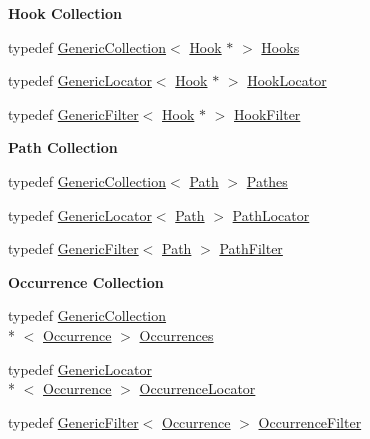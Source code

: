 \begin{Indent}{\bf Hook Collection}\par
\begin{DoxyCompactItemize}
\item 
typedef \hyperlink{classHurricane_1_1GenericCollection}{Generic\-Collection}$<$ \hyperlink{classHurricane_1_1Hook}{Hook} $\ast$ $>$ \hyperlink{namespaceHurricane_a9dcd9b74dc5e2b51bec7a13c25807e02}{Hooks}
\item 
typedef \hyperlink{classHurricane_1_1GenericLocator}{Generic\-Locator}$<$ \hyperlink{classHurricane_1_1Hook}{Hook} $\ast$ $>$ \hyperlink{namespaceHurricane_aca3a5babe6265eb9f140112d8e8b79e6}{Hook\-Locator}
\item 
typedef \hyperlink{classHurricane_1_1GenericFilter}{Generic\-Filter}$<$ \hyperlink{classHurricane_1_1Hook}{Hook} $\ast$ $>$ \hyperlink{namespaceHurricane_a9287de05984b91e55592a77e8d394324}{Hook\-Filter}
\end{DoxyCompactItemize}
\end{Indent}
\begin{Indent}{\bf Path Collection}\par
\begin{DoxyCompactItemize}
\item 
typedef \hyperlink{classHurricane_1_1GenericCollection}{Generic\-Collection}$<$ \hyperlink{classHurricane_1_1Path}{Path} $>$ \hyperlink{namespaceHurricane_a77e8a0f11b7d0d65a47a592f7bdfd061}{Pathes}
\item 
typedef \hyperlink{classHurricane_1_1GenericLocator}{Generic\-Locator}$<$ \hyperlink{classHurricane_1_1Path}{Path} $>$ \hyperlink{namespaceHurricane_a4077fe144cc9efa686ec63667b7dd9bf}{Path\-Locator}
\item 
typedef \hyperlink{classHurricane_1_1GenericFilter}{Generic\-Filter}$<$ \hyperlink{classHurricane_1_1Path}{Path} $>$ \hyperlink{namespaceHurricane_af42ed7a6acaba43b9d5f30b789105bc1}{Path\-Filter}
\end{DoxyCompactItemize}
\end{Indent}
\begin{Indent}{\bf Occurrence Collection}\par
\begin{DoxyCompactItemize}
\item 
typedef \hyperlink{classHurricane_1_1GenericCollection}{Generic\-Collection}\\*
$<$ \hyperlink{classHurricane_1_1Occurrence}{Occurrence} $>$ \hyperlink{namespaceHurricane_a1912927c128eee859af62dbe4cbe0a6b}{Occurrences}
\item 
typedef \hyperlink{classHurricane_1_1GenericLocator}{Generic\-Locator}\\*
$<$ \hyperlink{classHurricane_1_1Occurrence}{Occurrence} $>$ \hyperlink{namespaceHurricane_aa3f9cf43b9c8f3050da0a2549bb3d64d}{Occurrence\-Locator}
\item 
typedef \hyperlink{classHurricane_1_1GenericFilter}{Generic\-Filter}$<$ \hyperlink{classHurricane_1_1Occurrence}{Occurrence} $>$ \hyperlink{namespaceHurricane_a4d74662402bde091565f52b77e261560}{Occurrence\-Filter}
\end{DoxyCompactItemize}
\end{Indent}
